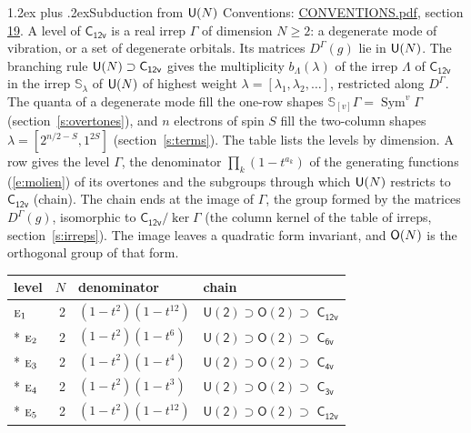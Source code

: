 \documentclass[10pt,a4paper]{article}
\makeatletter
\renewcommand\section{\@startsection{section}{1}{\z@}{-3ex plus -1ex minus -.2ex}%
  {1.2ex plus .2ex}{\normalfont\large\sffamily\bfseries\color{parttitle}}}
\numberwithin{equation}{section}
\newcommand{\grp}[1]{\mathsf{#1}}
\newcommand{\irr}[1]{\text{\normalfont\scshape #1}}
\newcommand{\repD}[1]{D^{#1}}
\newcommand{\schur}[1]{\mathbb{S}_{#1}}
\newcommand{\shape}[1]{[#1]}
\makeatother
\begin{document}
\section{Subduction from \texorpdfstring{$\grp{U(\mathnormal{N})}$}{U(N)}}\label{s:unitary}
Conventions: \href{../../CONVENTIONS.pdf}{CONVENTIONS.pdf}, section \href{../../CONVENTIONS.pdf\#conv.19}{19}.
\leavevmode\label{n:local.level.dimension}A level of $\grp{C_{12v}}$ is a real irrep $\Gamma$ of dimension $N \ge 2$: a degenerate mode of vibration, or a set of degenerate orbitals. \label{n:group.unitary}Its matrices $\repD{\Gamma}(g)$ lie in $\grp{U(\mathnormal{N})}$. \label{n:irrep.schur}\label{n:shape.partition}\label{n:local.partition}\label{n:function.multiplicity.unitary}The branching rule $\grp{U(\mathnormal{N})} \supset \grp{C_{12v}}$ gives the multiplicity $b_\Lambda(\lambda)$ of the irrep $\Lambda$ of $\grp{C_{12v}}$ in the irrep $\schur{\lambda}$ of $\grp{U(\mathnormal{N})}$ of highest weight $\lambda = \shape{\lambda_1, \lambda_2, \dots}$, restricted along $\repD{\Gamma}$. \label{n:local.partition.power}\label{n:local.electrons}\label{n:local.spin}The quanta of a degenerate mode fill the one-row shapes $\schur{\shape{v}}\Gamma = \operatorname{Sym}^{v}\Gamma$ (section~\ref{s:overtones}), and $n$ electrons of spin $S$ fill the two-column shapes $\lambda = \shape{2^{n/2-S}, 1^{2S}}$ (section~\ref{s:terms}).
The table lists the levels by dimension. \label{n:head.level}\label{n:head.denominator}\label{n:index.overtone.denominator}\label{n:head.chain}A row gives the level $\Gamma$, the denominator $\prod_k (1 - t^{a_k})$ of the generating functions (\ref{e:molien}) of its overtones and the subgroups through which $\grp{U(\mathnormal{N})}$ restricts to $\grp{C_{12v}}$ (chain). The chain ends at the image of $\Gamma$, the group formed by the matrices $\repD{\Gamma}(g)$, isomorphic to $\grp{C_{12v}}/\ker\Gamma$ (the column kernel of the table of irreps, section~\ref{s:irreps}). The image leaves a quadratic form invariant, and $\grp{O(\mathnormal{N})}$ is the orthogonal group of that form.
{\small\begin{longtable}{@{}lrll@{}}\toprule
level & $N$ & denominator & chain\\\midrule\endhead
\bottomrule\endfoot\endlastfoot
$\irr{e}_{1}$ & 2 & $(1-t^{2})(1-t^{12})$ & $\grp{U(2)} \supset \grp{O(2)} \supset$ \href{C12v.pdf}{$\grp{C_{12v}}$}\\*
$\irr{e}_{2}$ & 2 & $(1-t^{2})(1-t^{6})$ & $\grp{U(2)} \supset \grp{O(2)} \supset$ \href{C6v.pdf}{$\grp{C_{6v}}$}\\*
$\irr{e}_{3}$ & 2 & $(1-t^{2})(1-t^{4})$ & $\grp{U(2)} \supset \grp{O(2)} \supset$ \href{C4v.pdf}{$\grp{C_{4v}}$}\\*
$\irr{e}_{4}$ & 2 & $(1-t^{2})(1-t^{3})$ & $\grp{U(2)} \supset \grp{O(2)} \supset$ \href{C3v.pdf}{$\grp{C_{3v}}$}\\*
$\irr{e}_{5}$ & 2 & $(1-t^{2})(1-t^{12})$ & $\grp{U(2)} \supset \grp{O(2)} \supset$ \href{C12v.pdf}{$\grp{C_{12v}}$}\\
\bottomrule\end{longtable}}
\end{document}
